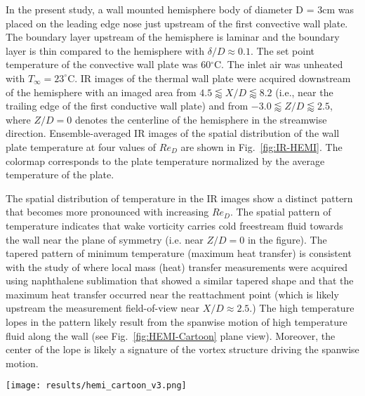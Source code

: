 In the present study, a wall mounted hemisphere body of diameter D = 3cm was placed on the leading edge nose just upstream of the first convective wall plate. 
The boundary layer upstream of the hemisphere is laminar and the boundary layer is thin compared to the hemisphere with $\delta/D \approx 0.1$.  
The set point temperature of the convective wall plate was 60$^\circ$C. The inlet air was unheated with $T_\infty = 23^\circ$C. 
IR images of the thermal wall plate were acquired downstream of the hemisphere with an imaged area from $4.5 \lessapprox X/D \lessapprox 8.2$ (i.e., near the trailing edge of the first conductive wall plate) and from $-3.0 \lessapprox Z/D \lessapprox 2.5$, where $Z/D=0$ denotes the centerline of the hemisphere in the streamwise direction. 
Ensemble-averaged IR images of the spatial distribution of the wall plate temperature at four values of $Re_D$ are shown in Fig.~\ref{fig:IR-HEMI}. 
The colormap corresponds to the plate temperature normalized by the average temperature of the plate.  

The spatial distribution of temperature in the IR images show a distinct pattern that becomes more pronounced with increasing $Re_D$. 
The spatial pattern of temperature indicates that wake vorticity carries cold freestream fluid towards the wall near the plane of symmetry (i.e. near $Z/D = 0$ in the figure). 
The tapered pattern of minimum temperature (maximum heat transfer) is consistent with the study of \cite{Chyu1996} where local mass (heat) transfer measurements were acquired using naphthalene sublimation that showed a similar tapered shape and that the maximum heat transfer occurred near the reattachment point (which is likely upstream the measurement field-of-view near $X/D \approx 2.5$.) 
The high temperature lopes in the pattern likely result from the spanwise motion of high temperature fluid along the wall (see Fig.~\ref{fig:HEMI-Cartoon} plane view). 
Moreover, the center of the lope is likely a signature of the vortex structure driving the spanwise motion. 

\begin{figure*}[h!]
\centering
\texttt{[image: results/hemi\_cartoon\_v3.png]}
\caption{Two plane view of cartoon depiction for resulting flow field from hemisphere perturbation. The XZ plane provides a birds eye view of the developing vortex wake, and the YZ plane provides a view of vortex wake downstream of the hemisphere and the resulting wall temperature.} 
\label{fig:HEMI-Cartoon}
\end{figure*}

